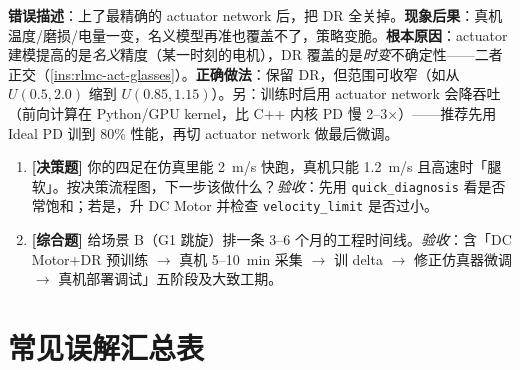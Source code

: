 \begin{pitfall}
\textbf{错误描述}：上了最精确的 actuator network 后，把 DR 全关掉。\textbf{现象后果}：真机温度/磨损/电量一变，名义模型再准也覆盖不了，策略变脆。\textbf{根本原因}：actuator 建模提高的是\emph{名义}精度（某一时刻的电机），DR 覆盖的是\emph{时变}不确定性——二者正交（\cref{ins:rlmc-act-glasses}）。\textbf{正确做法}：保留 DR，但范围可收窄（如从 $U(0.5,2.0)$ 缩到 $U(0.85,1.15)$）。另：训练时启用 actuator network 会降吞吐（前向计算在 Python/GPU kernel，比 C++ 内核 PD 慢 2--3$\times$）——推荐先用 Ideal PD 训到 80\% 性能，再切 actuator network 做最后微调。
\end{pitfall}

\begin{practice}[本节练习]
\begin{enumerate}
  \item \textbf{[决策题]} 你的四足在仿真里能 2~m/s 快跑，真机只能 1.2~m/s 且高速时「腿软」。按决策流程图，下一步该做什么？\emph{验收}：先用 \verb|quick_diagnosis| 看是否常饱和；若是，升 DC Motor 并检查 \verb|velocity_limit| 是否过小。
  \item \textbf{[综合题]} 给场景 B（G1 跳旋）排一条 3--6 个月的工程时间线。\emph{验收}：含「DC Motor$+$DR 预训练 $\to$ 真机 5--10~min 采集 $\to$ 训 delta $\to$ 修正仿真器微调 $\to$ 真机部署调试」五阶段及大致工期。
\end{enumerate}
\end{practice}

\section*{常见误解汇总表}
\label{sec:rlmc-act-misconceptions}

